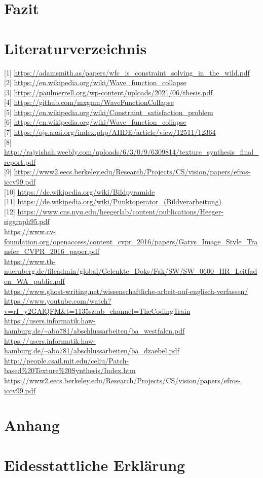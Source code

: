 \documentclass[12pt]{report}
\begin{document}
{\let\clearpage\relax\chapter{Fazit}}

{\let\clearpage\relax\chapter{Literaturverzeichnis}}
{[1]} \url{https://adamsmith.as/papers/wfc_is_constraint_solving_in_the_wild.pdf}\\
{[2]} \url{https://en.wikipedia.org/wiki/Wave_function_collapse}\\
{[3]} \url{https://paulmerrell.org/wp-content/uploads/2021/06/thesis.pdf}\\
{[4]} \url{https://github.com/mxgmn/WaveFunctionCollapse}\\
{[5]} \url{https://en.wikipedia.org/wiki/Constraint_satisfaction_problem}\\
{[6]} \url{https://en.wikipedia.org/wiki/Wave_function_collapse}\\
{[7]} \url{https://ojs.aaai.org/index.php/AIIDE/article/view/12511/12364}\\
{[8]} \url{http://rajvishah.weebly.com/uploads/6/3/0/9/6309814/texture_synthesis_final_report.pdf}\\
{[9]} \url{https://www2.eecs.berkeley.edu/Research/Projects/CS/vision/papers/efros-iccv99.pdf}\\
{[10]} \url{https://de.wikipedia.org/wiki/Bildpyramide}\\
{[11]} \url{https://de.wikipedia.org/wiki/Punktoperator_(Bildverarbeitung)}\\
{[12]} \url{https://www.cns.nyu.edu/heegerlab/content/publications/Heeger-siggraph95.pdf}\\
\url{https://www.cv-foundation.org/openaccess/content_cvpr_2016/papers/Gatys_Image_Style_Transfer_CVPR_2016_paper.pdf}\\
\url{https://www.th-nuernberg.de/fileadmin/global/Gelenkte_Doks/Fak/SW/SW_0600_HR_Leitfaden_WA_public.pdf}\\
\url{https://www.ghost-writing.net/wissenschaftliche-arbeit-auf-englisch-verfassen/}\\
\url{https://www.youtube.com/watch?v=rI_y2GAlQFM&t=1135s&ab_channel=TheCodingTrain}\\
\url{https://users.informatik.haw-hamburg.de/~abo781/abschlussarbeiten/ba_westfalen.pdf}\\
\url{https://users.informatik.haw-hamburg.de/~abo781/abschlussarbeiten/ba_dzaebel.pdf}\\
\url{http://people.csail.mit.edu/celiu/Patch-based%20Texture%20Synthesis/Index.htm}\\
\url{https://www2.eecs.berkeley.edu/Research/Projects/CS/vision/papers/efros-iccv99.pdf}\\


{\let\clearpage\relax\chapter{Anhang}}
{\let\clearpage\relax\chapter{Eidesstattliche Erklärung}}
\end{document}
